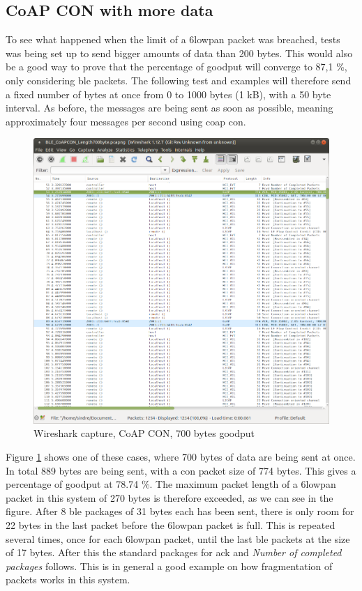 \subsection{CoAP CON with more data}

To see what happened when the limit of a \gls{6lowpan} packet was breached, tests was being set up to send bigger amounts of data than 200 bytes. This would also be a good way to prove that the percentage of goodput will converge to 87,1 \%, only considering \gls{ble} packets. The following test and examples will therefore send a fixed number of bytes at once from 0 to 1000 bytes (1 kB), with a 50 byte interval. As before, the messages are being sent as soon as possible, meaning approximately  four messages per second using \gls{coap} \gls{con}. 

\begin{figure}[ht]
    \centering
    \includegraphics[width=\textwidth]{Wireshark700bytes2.png}    
    \caption{Wireshark capture, CoAP CON, 700 bytes goodput}
    \label{fig:coapCON700Wireshark}
\end{figure}

Figure \ref{fig:coapCON700Wireshark} shows one of these cases, where 700 bytes of data are being sent at once. In total 889 bytes are being sent, with a \gls{con} packet size of 774 bytes. This gives a percentage of goodput at 78.74 \%. The maximum packet length of a \gls{6lowpan} packet in this system of 270 bytes is therefore exceeded, as we can see in the figure. After 8 \gls{ble} packages of 31 bytes each has been sent, there is only room for 22 bytes in the last packet before the \gls{6lowpan} packet is full. This is repeated several times, once for each \gls{6lowpan} packet, until the last \gls{ble} packets at the size of 17 bytes. After this the standard packages for \gls{ack} and \textit{Number of completed packages} follows. This is in general a good example on how fragmentation of packets works in this system. 


